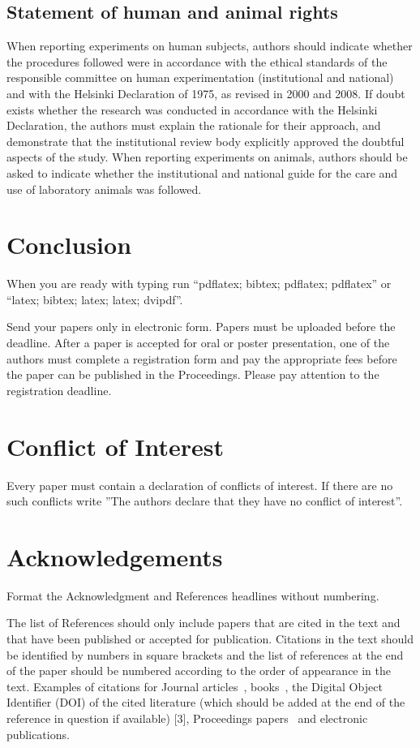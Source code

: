\documentclass[nouppercase]{cmbec}
\begin{document}
\subsection{Statement of human and animal rights}
When reporting experiments on human subjects, authors should indicate whether the procedures followed were in accordance with the ethical standards of the responsible committee on human experimentation (institutional and national) and with the Helsinki Declaration of 1975, as revised in 2000 and 2008. If doubt exists whether the research was conducted in accordance with the Helsinki Declaration, the authors must explain the rationale for their approach, and demonstrate that the institutional review body explicitly approved the doubtful aspects of the study. When reporting experiments on animals, authors should be asked to indicate whether the institutional and national guide for the care and use of laboratory animals was followed.


\section{Conclusion}

When you are ready with typing run ``pdflatex; bibtex; pdflatex; pdflatex'' or ``latex; bibtex; latex; latex; dvipdf''.

Send your papers only in electronic form. Papers must be uploaded before the deadline. After a paper is accepted for oral or poster presentation, one of the authors must complete a registration form and pay the appropriate fees before the paper can be published in the Proceedings. Please pay attention to the registration deadline.

\section*{Conflict of Interest}
Every paper must contain a declaration of conflicts of interest. If there are no such conflicts write ''The authors declare that they have no conflict of interest''.


\section*{Acknowledgements}

Format the Acknowledgment and References headlines without numbering.

\bigskip
The list of References should only include papers that are cited in the text and that have been published or accepted for publication. Citations in the text should be identified by numbers in square brackets and the
list of references at the end of the paper should be numbered according to the order of appearance in the text. Examples of citations for Journal articles~\cite{smith99}, books~\cite{south01}, the Digital Object Identifier (DOI) of the cited literature (which should be added at the end of the reference in question if available) [3], Proceedings papers~\cite{lock03} and electronic publications.
\end{document}
